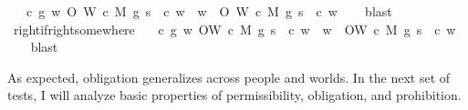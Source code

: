 \begin{isabellebody}
\ \ \ {\isachardoublequoteopen}{\isasymforall}c\ g{\isachardot}\ {\isasymexists}w{}{\isachardot}\ O{\isacharbraceleft}\isactrlbold {\isasymnot}\ {\isacharparenleft}W\ {\isacharparenleft}c{\isacharcomma}\ M{\isacharcomma}\ g{\isacharparenright}\ s{\isacharparenright}\ {\isacharbar}\ c{\isacharbraceright}\ w{}\ {\isasymlongrightarrow}\ {\isacharparenleft}{\isasymforall}w{}{\isachardot}\ \ O{\isacharbraceleft}\isactrlbold {\isasymnot}\ {\isacharparenleft}W\ {\isacharparenleft}c{\isacharcomma}\ M{\isacharcomma}\ g{\isacharparenright}\ s{\isacharparenright}\ {\isacharbar}\ c{\isacharbraceright}\ w{}{\isacharparenright}{\isachardoublequoteclose}\isanewline
%
\isadelimproof
\ \ %
\endisadelimproof
%
\isatagproof
{}\isamarkupfalse%
\ blast%
\endisatagproof
{\isafoldproof}%
%
\isadelimproof
\isanewline
%
\endisadelimproof
\isanewline
{}\isamarkupfalse%
\ right{\isacharunderscore}if{\isacharunderscore}right{\isacharunderscore}somewhere{\isacharcolon}\isanewline
\ \ \ {\isachardoublequoteopen}{\isasymforall}c\ g{\isachardot}\ {\isasymexists}w{}{\isachardot}\ O{\isacharbraceleft}W\ {\isacharparenleft}c{\isacharcomma}\ M{\isacharcomma}\ g{\isacharparenright}\ s\ {\isacharbar}\ c{\isacharbraceright}\ w{}\ {\isasymlongrightarrow}\ {\isacharparenleft}{\isasymforall}w{}{\isachardot}\ \ O{\isacharbraceleft}W\ {\isacharparenleft}c{\isacharcomma}\ M{\isacharcomma}\ g{\isacharparenright}\ s\ {\isacharbar}\ c{\isacharbraceright}\ w{}{\isacharparenright}{\isachardoublequoteclose}\isanewline
%
\isadelimproof
\ \ %
\endisadelimproof
%
\isatagproof
{}\isamarkupfalse%
\ blast%
\endisatagproof
{\isafoldproof}%
%
\isadelimproof
%
\endisadelimproof
%
\begin{isamarkuptext}%
As expected, obligation generalizes across people and worlds. In the next set of tests, I will 
analyze basic properties of permissibility, obligation, and prohibition. 


\end{isamarkuptext}
\end{isabellebody}
